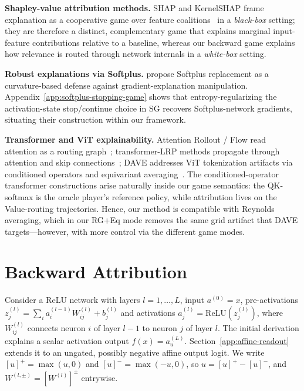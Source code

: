 \documentclass[twoside]{article}
\newcommand{\relu}{\text{ReLU}}
\newcommand{\1}{\mathbf{1}}
\begin{document}
\textbf{Shapley-value attribution methods.} SHAP and KernelSHAP frame explanation as a cooperative
game over feature coalitions~\citep{Lundberg2017} in a \emph{black-box} setting; they are therefore
a distinct, complementary game that explains marginal input-feature contributions relative to a
baseline, whereas our backward game explains how relevance is routed through network internals in a
\emph{white-box} setting.

\textbf{Robust explanations via Softplus.} \citet{Dombrowski2020} propose Softplus replacement as a
curvature-based defense against gradient-explanation manipulation.
Appendix~\ref{app:softplus-stopping-game} shows that entropy-regularizing the activation-state
stop/continue choice in \ac{SG} recovers Softplus-network gradients, situating their construction
within our framework.

\textbf{Transformer and ViT explainability.} Attention Rollout / Flow read attention as a routing
graph~\citep{Abnar2020attention}; transformer-\ac{LRP} methods propagate through attention and skip
connections~\citep{Chefer2021transformer, Ali2022, achtibat2024attnlrp}; DAVE addresses ViT
tokenization artifacts via conditioned operators and equivariant averaging~\citep{Wrobel2024}. The
conditioned-operator transformer constructions arise naturally inside our game semantics: the
QK-softmax is the oracle player's reference policy, while attribution lives on the Value-routing
trajectories. Hence, our method is compatible with Reynolds averaging, which in our \ac{RG}+Eq mode
removes the same grid artifact that DAVE targets---however, with more control via the different
game modes.
\section{Backward Attribution}\label{sec:background}

Consider a ReLU network with layers $l = 1,\dots,L$, input $a^{(0)} = x$, pre-activations
$z^{(l)}_j = \sum_i a^{(l-1)}_i W^{(l)}_{ij} + b^{(l)}_j$ and activations $a^{(l)}_j =
    \relu(z^{(l)}_j)$, where $W^{(l)}_{ij}$ connects neuron $i$ of layer $l{-}1$ to neuron $j$ of layer
$l$. The initial derivation explains a scalar activation output $f(x) = a^{(L)}_u$.
Section~\ref{app:affine-readout} extends it to an ungated, possibly negative
affine output logit. We write $[u]^{+} = \max(u,0)$ and $[u]^{-} =
    \max(-u,0)$, so $u = [u]^+ - [u]^-$, and $W^{(l,\pm)} = [W^{(l)}]^{\pm}$ entrywise.
\end{document}
